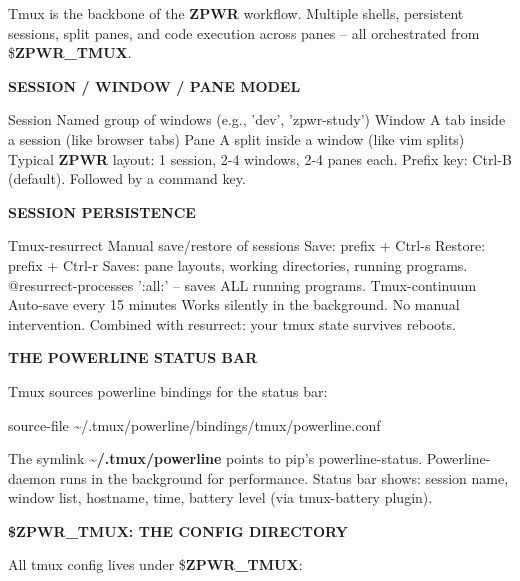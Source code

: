 \documentclass[11pt,a4paper,twoside]{book}
\begin{document}
Tmux is the backbone of the \textbf{ZPWR} workflow. Multiple shells, persistent sessions, split panes, and code execution across panes -- all orchestrated from \$\textbf{ZPWR\_TMUX}.


\vspace{12pt}
{\bfseries\color{neonyellow} SESSION / WINDOW / PANE MODEL}\vspace{4pt}

Session    Named group of windows (e.g., 'dev', 'zpwr-study') Window     A tab inside a session (like browser tabs) Pane       A split inside a window (like vim splits) Typical \textbf{ZPWR} layout: 1 session, 2-4 windows, 2-4 panes each. Prefix key: Ctrl-B (default). Followed by a command key.


\vspace{12pt}
{\bfseries\color{neonyellow} SESSION PERSISTENCE}\vspace{4pt}

Tmux-resurrect   Manual save/restore of sessions Save: prefix + Ctrl-s Restore: prefix + Ctrl-r Saves: pane layouts, working directories, running programs. @resurrect-processes ':all:' -- saves ALL running programs. Tmux-continuum    Auto-save every 15 minutes Works silently in the background. No manual intervention. Combined with resurrect: your tmux state survives reboots.


\vspace{12pt}
{\bfseries\color{neonyellow} THE POWERLINE STATUS BAR}\vspace{4pt}

Tmux sources powerline bindings for the status bar:

\begin{codebox}
\color{neongreen}source-file \textasciitilde{}/.tmux/powerline/bindings/tmux/powerline.conf\\
\end{codebox}

The symlink \textbf{\textasciitilde{}/.tmux/powerline} points to pip's powerline-status. Powerline-daemon runs in the background for performance. Status bar shows: session name, window list, hostname, time, battery level (via tmux-battery plugin).


\vspace{12pt}
{\bfseries\color{neonyellow} \$\textbf{ZPWR\_TMUX}: THE CONFIG DIRECTORY}\vspace{4pt}

All tmux config lives under \$\textbf{ZPWR\_TMUX}:
\end{document}
